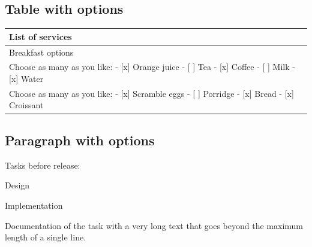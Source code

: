 \documentclass[11pt,a4paper]{article}
\begin{document}
\subsection{Table with options}

\begin{table}[h]
\begin{tabular}{|l|}
\hline
\textbf{List of services} \\ \hline
Breakfast options \\ \hline
Choose as many as you like:  - [x] Orange juice  - [ ] Tea  - [x] Coffee  - [ ] Milk  - [x] Water \\ \hline
Choose as many as you like:  - [x] Scramble eggs  - [ ] Porridge  - [x] Bread  - [x] Croissant \\ \hline
\end{tabular}
\end{table}

\subsection{Paragraph with options}

Tasks before release:

Design

Implementation

Documentation of the task with a very long text that goes beyond the maximum length of a single line.
\end{document}
